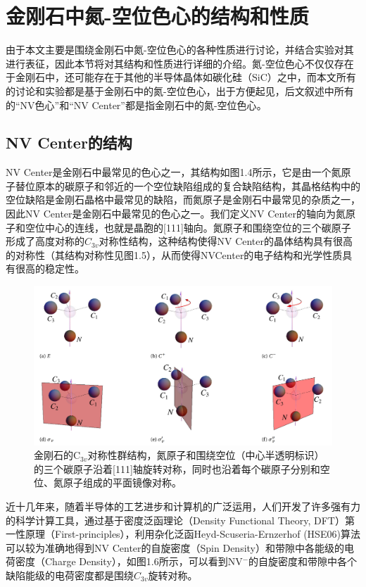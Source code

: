 \documentclass[type = bachelor]{whu-thesis}
\begin{document}
\section{金刚石中氮-空位色心的结构和性质}

由于本文主要是围绕金刚石中氮-空位色心的各种性质进行讨论，并结合实验对其进行表征，因此本节将对其结构和性质进行详细的介绍。氮-空位色心不仅仅存在于金刚石中，还可能存在于其他的半导体晶体如碳化硅（SiC）之中，而本文所有的讨论和实验都是基于金刚石中的氮-空位色心，出于方便起见，后文叙述中所有的“NV色心”和“NV Center”都是指金刚石中的氮-空位色心\cite{von2015identification, csore2017characterization}。

\subsection{NV Center的结构}
NV Center是金刚石中最常见的色心之一，其结构如图1.4所示，它是由一个氮原子替位原本的碳原子和邻近的一个空位缺陷组成的复合缺陷结构，其晶格结构中的空位缺陷是金刚石晶格中最常见的缺陷，而氮原子是金刚石中最常见的杂质之一，因此NV Center是金刚石中最常见的色心之一。我们定义NV Center的轴向为氮原子和空位中心的连线，也就是晶胞的[111]轴向。氮原子和围绕空位的三个碳原子形成了高度对称的$C_{3v}$对称性结构，这种结构使得NV Center的晶体结构具有很高的对称性（其结构对称性见图1.5），从而使得NVCenter的电子结构和光学性质具有很高的稳定性。

\begin{figure}
  \centering
  \includegraphics[width=1.0\textwidth]{figures/Chapter 1/NV Symmetry.png}
  \caption[金刚石的C$_{3v}$对称性群结构]{金刚石的C$_{3v}$对称性群结构，氮原子和围绕空位（中心半透明标识）的三个碳原子沿着[111]轴旋转对称，同时也沿着每个碳原子分别和空位、氮原子组成的平面镜像对称。}
  \label{fig: NV Symmetry}
\end{figure}

近十几年来，随着半导体的工艺进步和计算机的广泛运用，人们开发了许多强有力的科学计算工具，通过基于密度泛函理论（Density Functional Theory, DFT）第一性原理（First-principles），利用杂化泛函Heyd-Scuseria-Ernzerhof (HSE06)算法可以较为准确地得到NV Center的自旋密度（Spin Density）和带隙中各能级的电荷密度（Charge Density），如图1.6所示，可以看到NV$^-$的自旋密度和带隙中各个缺陷能级的电荷密度都是围绕$C_{3v}$旋转对称\cite{zou2023influence}。
\end{document}
